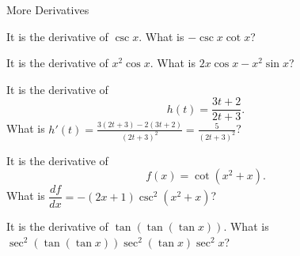 \documentclass{article}
\begin{document}
\begin{category}{More Derivatives}

  \begin{clue}[write]
    It is the derivative of $\csc x.$
  \response
    What is $-\csc x \cot x$?
  \end{clue}

  \begin{clue}[write]
    It is the derivative of $x^2 \cos x.$
  \response
    What is $2x\cos x - x^2 \sin x$?
  \end{clue}

  \begin{clue}[write]
    It is the derivative of
    \[ h(t) = \frac{3t+2}{2t+3}. \]
  \response
    What is $\displaystyle h'(t) = \frac{3(2t+3) - 2(3t+2)}{(2t+3)^2} = \frac{5}{(2t+3)^2}$?
  \end{clue}

  \begin{clue}
    It is the derivative of
    \[ f(x) = \cot(x^2 + x). \]
  \response
    What is $\dfrac{df}{dx} = -(2x+1)\csc^2(x^2+x)$?
  \end{clue}

  \begin{clue}[write]
    It is the derivative of $\tan(\tan(\tan x)).$
  \response
    What is $\sec^2(\tan(\tan x)) \sec^2(\tan x) \sec^2 x$?
  \end{clue}

\end{category}
\end{document}
